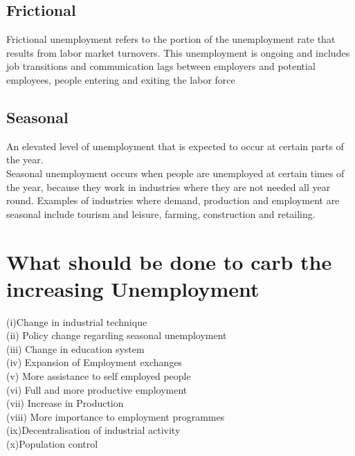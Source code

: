 \documentclass[a4paper, 12pt]{article}
\begin{document}
\subsection{Frictional}
Frictional unemployment refers to the portion of the unemployment rate that results from labor market turnovers. This unemployment is ongoing and includes job transitions and communication lags between employers and potential employees, people entering and exiting the labor force 

\subsection{Seasonal}
An elevated level of unemployment that is expected to occur at certain parts of the year.\\
Seasonal unemployment occurs when people are unemployed at certain times of the year, because they work in industries where they are not needed all year round. Examples of industries where demand, production and employment are seasonal include tourism and leisure, farming, construction and retailing.

\section{What should be done to carb the increasing Unemployment}
 (i)Change in industrial technique\\
(ii) Policy change regarding seasonal unemployment\\
(iii) Change in education system\\
(iv) Expansion of Employment exchanges\\
(v) More assistance to self employed people\\
(vi) Full and more productive employment\\
(vii) Increase in Production\\
(viii) More importance to employment programmes\\
(ix)Decentralisation of industrial activity\\
(x)Population control
\end{document}
